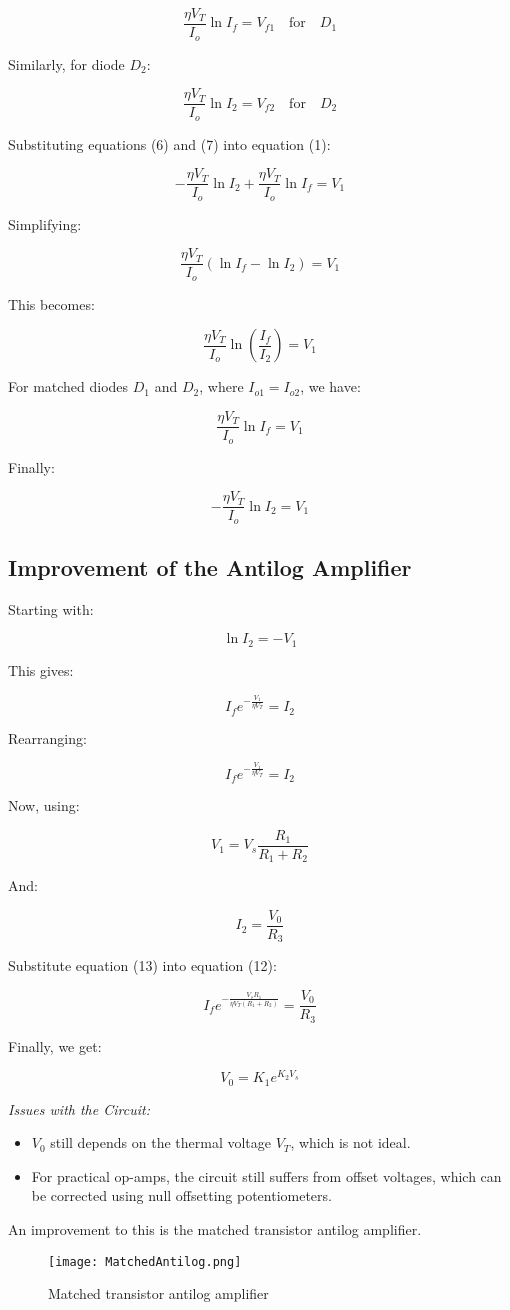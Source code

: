 \documentclass[a4paper,9pt,twoside,openany,twocolumn]{memoir}
\begin{document}
\[
\frac{\eta V_T}{I_o} \ln I_{f} = V_{f1} \quad \text{for} \quad D_1 \tag{6}
\]

Similarly, for diode \( D_2 \):

\[
\frac{\eta V_T}{I_o} \ln I_{2} = V_{f2} \quad \text{for} \quad D_2 \tag{7}
\]

Substituting equations (6) and (7) into equation (1):

\[
- \frac{\eta V_T}{I_o} \ln I_2 + \frac{\eta V_T}{I_o} \ln I_f = V_1 \tag{8}
\]

Simplifying:

\[
\frac{\eta V_T}{I_o} \left( \ln I_f - \ln I_2 \right) = V_1 \tag{9}
\]

This becomes:

\[
\frac{\eta V_T}{I_o} \ln \left( \frac{I_f}{I_2} \right) = V_1 \tag{10}
\]

For matched diodes \( D_1 \) and \( D_2 \), where \( I_{o1} = I_{o2} \), we have:

\[
\frac{\eta V_T}{I_o} \ln I_f = V_1 \tag{11}
\]

Finally:

\[
- \frac{\eta V_T}{I_o} \ln I_2 = V_1 \tag{12}
\]
\subsection*{Improvement of the Antilog Amplifier}

Starting with:

\[
\ln I_2 = - V_1 \tag{10}
\]

This gives:

\[
I_f e^{-\frac{V_1}{\eta V_T}} = I_2 \tag{11}
\]

Rearranging:

\[
I_f e^{-\frac{V_1}{\eta V_T}} = I_2 \tag{12}
\]

Now, using:

\[
V_1 = V_s \frac{R_1}{R_1 + R_2} \tag{13}
\]

And:

\[
I_2 = \frac{V_0}{R_3} \tag{14}
\]

Substitute equation (13) into equation (12):

\[
I_f e^{-\frac{V_s R_1}{\eta V_T (R_1 + R_2)}} = \frac{V_0}{R_3} \tag{15}
\]

Finally, we get:

\[
V_0 = K_1 e^{K_2 V_s} \tag{16}
\]

\textit{Issues with the Circuit:}
\begin{itemize}
\item  \( V_0 \) still depends on the thermal voltage \( V_T \), which is not ideal.
\item For practical op-amps, the circuit still suffers from offset voltages, which can be corrected using null offsetting potentiometers.


\end{itemize}
An improvement to this is the matched transistor antilog amplifier.
\begin{figure}[H]
    \centering
    \texttt{[image: MatchedAntilog.png]}
    \caption{Matched transistor antilog amplifier}
    \label{fig:question_image}
\end{figure}
\end{document}
